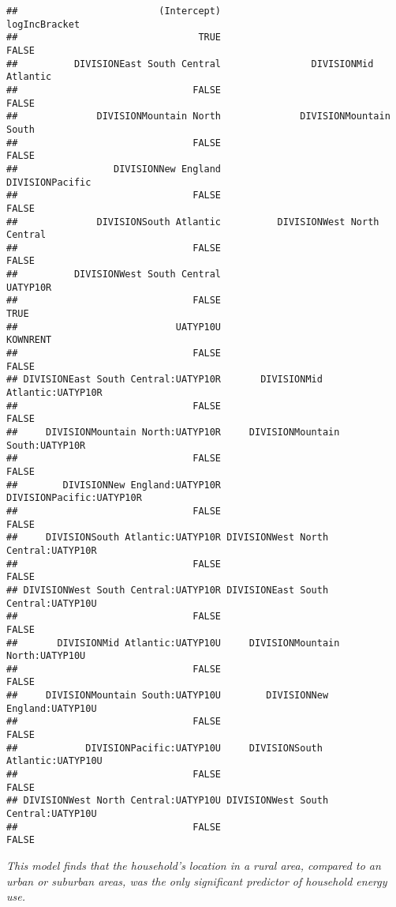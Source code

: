 \documentclass[
]{article}
\begin{document}
\begin{verbatim}
##                         (Intercept)                       logIncBracket 
##                                TRUE                               FALSE 
##          DIVISIONEast South Central                DIVISIONMid Atlantic 
##                               FALSE                               FALSE 
##              DIVISIONMountain North              DIVISIONMountain South 
##                               FALSE                               FALSE 
##                 DIVISIONNew England                     DIVISIONPacific 
##                               FALSE                               FALSE 
##              DIVISIONSouth Atlantic          DIVISIONWest North Central 
##                               FALSE                               FALSE 
##          DIVISIONWest South Central                            UATYP10R 
##                               FALSE                                TRUE 
##                            UATYP10U                            KOWNRENT 
##                               FALSE                               FALSE 
## DIVISIONEast South Central:UATYP10R       DIVISIONMid Atlantic:UATYP10R 
##                               FALSE                               FALSE 
##     DIVISIONMountain North:UATYP10R     DIVISIONMountain South:UATYP10R 
##                               FALSE                               FALSE 
##        DIVISIONNew England:UATYP10R            DIVISIONPacific:UATYP10R 
##                               FALSE                               FALSE 
##     DIVISIONSouth Atlantic:UATYP10R DIVISIONWest North Central:UATYP10R 
##                               FALSE                               FALSE 
## DIVISIONWest South Central:UATYP10R DIVISIONEast South Central:UATYP10U 
##                               FALSE                               FALSE 
##       DIVISIONMid Atlantic:UATYP10U     DIVISIONMountain North:UATYP10U 
##                               FALSE                               FALSE 
##     DIVISIONMountain South:UATYP10U        DIVISIONNew England:UATYP10U 
##                               FALSE                               FALSE 
##            DIVISIONPacific:UATYP10U     DIVISIONSouth Atlantic:UATYP10U 
##                               FALSE                               FALSE 
## DIVISIONWest North Central:UATYP10U DIVISIONWest South Central:UATYP10U 
##                               FALSE                               FALSE
\end{verbatim}

\emph{This model finds that the household's location in a rural area,
compared to an urban or suburban areas, was the only significant
predictor of household energy use.}
\end{document}
